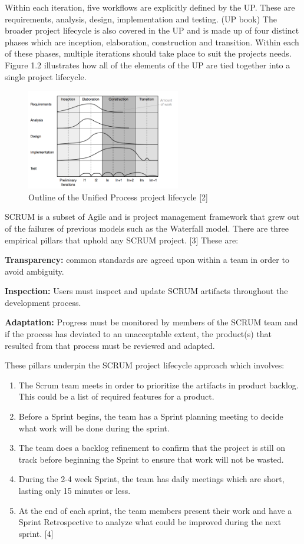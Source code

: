 \documentclass[fontsize=11pt]{extarticle}
\numberwithin{figure}{section} %
\numberwithin{table}{section}%
\begin{document}
Within each iteration, five workflows are explicitly defined by the UP.
These are requirements, analysis, design, implementation and testing.
(UP book) The broader project lifecycle is also covered in the UP and is
made up of four distinct phases which are inception, elaboration,
construction and transition. Within each of these phases, multiple
iterations should take place to suit the projects needs. Figure 1.2
illustrates how all of the elements of the UP are tied together into a
single project lifecycle.

\begin{figure}[H]
      \centering
      \includegraphics[trim = 0 0 0 0, clip, width=0.6\textwidth]{TempImg/UP.png}
      \caption{Outline of the Unified Process project lifecycle [2]}
 \end{figure}

SCRUM is a subset of Agile and is project management framework that grew
out of the failures of previous models such as the Waterfall model.
There are three empirical pillars that uphold any SCRUM project. {[}3{]}
These are:

\textbf{Transparency:} common standards are agreed upon within a team in
order to avoid ambiguity.

\textbf{Inspection:} Users must inspect and update SCRUM artifacts
throughout the development process.

\textbf{Adaptation:} Progress must be monitored by members of the SCRUM
team and if the process has deviated to an unacceptable extent, the
product(s) that resulted from that process must be reviewed and adapted.

These pillars underpin the SCRUM project lifecycle approach which
involves:

\begin{enumerate}
  \item The Scrum team meets in order to prioritize the artifacts in product backlog. This could be a list of required features for a product.
  \item Before a Sprint begins, the team has a Sprint planning meeting to decide what work will be done during the sprint.
  \item  The team does a backlog refinement to confirm that the project is still on track before beginning the Sprint to ensure that work will not be wasted.
  \item  During the 2-4 week Sprint, the team has daily meetings which are short, lasting only 15 minutes or less. 
  \item At the end of each sprint, the team members present their work and have a Sprint Retrospective to analyze what could be improved during the next sprint. [4]
\end{enumerate}
\end{document}
